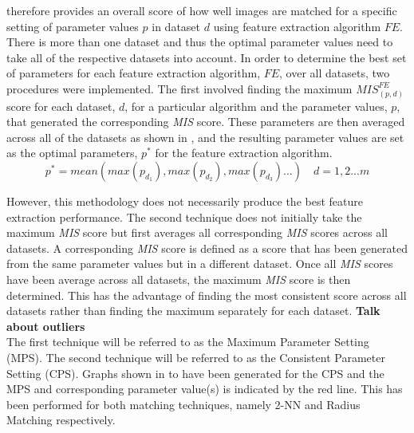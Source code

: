 \documentclass{report}
\begin{document}
 therefore provides an overall score of how well images are matched for a specific setting of parameter values $p$ in dataset $d$ using feature extraction algorithm $FE$. \\

There is more than one dataset and thus the optimal parameter values need to take all of the respective datasets into account. In order to determine the best set of parameters for each feature extraction algorithm, $FE$, over all datasets, two procedures were implemented. The first involved finding the maximum $\textit{MIS}_{(p, d)}^{FE}$ score for each dataset, $d$, for a particular algorithm and the parameter values, $p$, that generated the corresponding \textit{MIS} score. These parameters are then averaged across all of the datasets as shown in , and the resulting parameter values are set as the optimal parameters, $p^*$ for the feature extraction algorithm.\\

\begin{equation}
p^* = mean( max(p_{d_1}), max(p_{d_2}), max(p_{d_3}) ...) \quad d = 1,2...m
\label{eqn:average}
\end{equation}

However, this methodology does not necessarily produce the best feature extraction performance. The second technique does not initially take the maximum \textit{MIS} score but first averages all corresponding \textit{MIS} scores across all datasets. A corresponding \textit{MIS} score is defined as a score that has been generated from the same parameter values but in a different dataset. Once all \textit{MIS} scores have been average across all datasets, the maximum \textit{MIS} score is then determined. This has the advantage of finding the most consistent score across all datasets rather than finding the maximum separately for each dataset. \textbf{Talk about outliers}\\

The first technique will be referred to as the Maximum Parameter Setting (MPS). The second technique will be referred to as the Consistent Parameter Setting (CPS). Graphs shown in  to  have been generated for the CPS and the MPS and corresponding parameter value(s) is indicated by the red line. This has been performed for both matching techniques, namely 2-NN and Radius Matching respectively.\\

\end{document}
